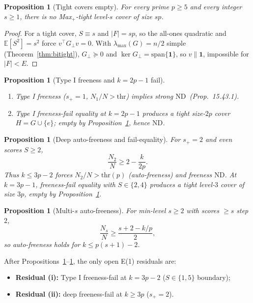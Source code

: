 \documentclass[11pt,a4paper]{article}
\theoremstyle{plain}
\newtheorem{proposition}[theorem]{Proposition}
\theoremstyle{definition}
\newcommand{\thr}{\mathrm{thr}}
\newcommand{\ND}{\ensuremath{\mathrm{ND}}}
\newcommand{\ES}{\mathbb{E}}
\begin{document}
\begin{proposition}[Tight covers empty]
\label{prop:tight}
For every prime $p\ge5$ and every integer $s\ge1$, there is no Max$_+$-tight level-$s$ cover
of size $sp$.
\end{proposition}

\begin{proof}
For a tight cover, $S\equiv s$ and $\lvert F\rvert=sp$, so the all-ones quadratic and
$\ES[S^2]=s^2$ force $v^\top G_\perp v=0$. With $\lambda_{\max}(G)=n/2$ simple
(Theorem~\ref{thm:bitight}), $G_\perp\succeq0$ and $\ker G_\perp=\mathrm{span}\{\mathbf{1}\}$,
so $v\parallel\mathbf{1}$, impossible for $\lvert F\rvert<E$.
\end{proof}

\begin{proposition}[Type I freeness and $k=2p-1$ fail]
\label{prop:typeI-easy}
\begin{enumerate}[label=(\roman*)]
\item Type I freeness ($s_+=1$, $N_1/N>\thr$) implies strong \ND\ (Prop.\ 15.43.1).
\item Type I freeness-fail equality at $k=2p-1$ produces a tight size-$2p$ cover
  $H=G\cup\{e\}$; empty by Proposition~\ref{prop:tight}, hence \ND.
\end{enumerate}
\end{proposition}

\begin{proposition}[Deep auto-freeness and fail-equality]
\label{prop:deep-auto}
For $s_+=2$ and even scores $S\ge2$,
\[
\frac{N_2}{N}\ge 2-\frac{k}{2p}.
\]
Thus $k\le3p-2$ forces $N_2/N>\thr(p)$ (auto-freeness) and freeness \ND.
At $k=3p-1$, freeness-fail equality with $S\in\{2,4\}$ produces a tight level-$3$ cover of
size $3p$, empty by Proposition~\ref{prop:tight}.
\end{proposition}

\begin{proposition}[Multi-$s$ auto-freeness]
\label{prop:multis}
For min-level $s\ge2$ with scores $\ge s$ step $2$,
\[
\frac{N_s}{N}\ge\frac{s+2-k/p}{2},
\]
so auto-freeness holds for $k\le p(s+1)-2$.
\end{proposition}

After Propositions~\ref{prop:typeI-easy}--\ref{prop:multis}, the only open E(1) residuals are:
\begin{itemize}
\item \textbf{Residual (i):} Type I freeness-fail at $k=3p-2$ ($S\in\{1,5\}$ boundary);
\item \textbf{Residual (ii):} deep freeness-fail at $k\ge3p$ ($s_+=2$).
\end{itemize}
\end{document}
